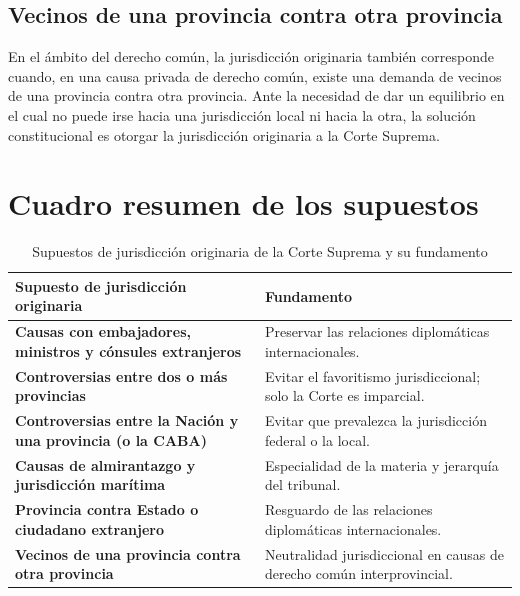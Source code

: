\documentclass[12pt,oneside]{book}
\begin{document}
\subsection{Vecinos de una provincia contra otra provincia}

En el ámbito del derecho común, la jurisdicción originaria también corresponde cuando, en una causa privada de derecho común, existe una demanda de vecinos de una provincia contra otra provincia. Ante la necesidad de dar un equilibrio en el cual no puede irse hacia una jurisdicción local ni hacia la otra, la solución constitucional es otorgar la jurisdicción originaria a la Corte Suprema.

\section{Cuadro resumen de los supuestos}

\begin{table}[H]
\centering
\caption{Supuestos de jurisdicción originaria de la Corte Suprema y su fundamento}
\begin{tabularx}{\textwidth}{Q{0.42\textwidth}Y}
\toprule
\textbf{Supuesto de jurisdicción originaria} & \textbf{Fundamento} \\
\midrule
\textbf{Causas con embajadores, ministros y cónsules extranjeros} & Preservar las relaciones diplomáticas internacionales. \\
\addlinespace
\textbf{Controversias entre dos o más provincias} & Evitar el favoritismo jurisdiccional; solo la Corte es imparcial. \\
\addlinespace
\textbf{Controversias entre la Nación y una provincia (o la CABA)} & Evitar que prevalezca la jurisdicción federal o la local. \\
\addlinespace
\textbf{Causas de almirantazgo y jurisdicción marítima} & Especialidad de la materia y jerarquía del tribunal. \\
\addlinespace
\textbf{Provincia contra Estado o ciudadano extranjero} & Resguardo de las relaciones diplomáticas internacionales. \\
\addlinespace
\textbf{Vecinos de una provincia contra otra provincia} & Neutralidad jurisdiccional en causas de derecho común interprovincial. \\
\bottomrule
\end{tabularx}
\end{table}
\end{document}
